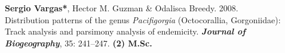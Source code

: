 \documentclass[letter,10pt]{article}
\begin{document}
\begin{description}

\item[]\textbf{Sergio Vargas*}, Hector M. Guzman \& Odalisca Breedy. 2008. Distribution patterns of the genus \emph{Pacifigorgia} (Octocorallia, Gorgoniidae): Track analysis and parsimony analysis of endemicity. \textbf{\emph{Journal of Biogeography}}, 35: 241--247. \hfill\textbf{{\scriptsize (2) M.Sc.}}

\end{description}


\end{document}
